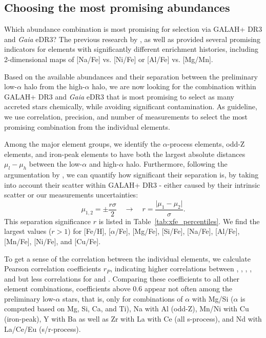 \documentclass[fleqn,usenatbib]{mnras}
\newcommand{\Gaia}{\textit{Gaia}\xspace} %
\begin{document}
\subsection{Choosing the most promising abundances} \label{sec:choosing_chemical_selection}

Which abundance combination is most promising for selection via GALAH+ DR3 and \Gaia eDR3? The previous research by \citet{Nissen2010, Nissen2011}, \citet{Hawkins2015} as well as \citet{Hayes2018} provided several promising indicators for elements with significantly different enrichment histories, including 2-dimensional maps of [Na/Fe] vs. [Ni/Fe] or [Al/Fe] vs. [Mg/Mn].

Based on the available abundances and their separation between the preliminary low-$\alpha$ halo from the high-$\alpha$ halo, we are now looking for the combination within GALAH+ DR3 and \Gaia eDR3 that is most promising to select as many accreted stars chemically, while avoiding significant contamination. As guideline, we use correlation, precision, and number of measurements to select the most promising combination from the individual elements.

Among the major element groups, we identify the $\alpha$-process elements, odd-Z elements, and iron-peak elements to have both the largest absolute distances $\mu_l - \mu_h$ between the low-$\alpha$ and high-$\alpha$ halo. Furthermore, following the argumentation by \citet{Lindegren2013}, we can quantify how significant their separation is, by taking into account their scatter within GALAH+ DR3 - either caused by their intrinsic scatter or our measurements uncertainties: 
\begin{equation}
\mu_{1,2} = \pm \frac{r \sigma}{2} \quad \rightarrow \quad r = \frac{\vert \mu_1 - \mu_2 \vert}{\sigma}.
\end{equation}
This separation significance $r$ is listed in Table~\ref{tab:xfe_percentiles}. We find the largest values ($r > 1$) for [Fe/H], [$\alpha$/Fe], [Mg/Fe], [Si/Fe], [Na/Fe], [Al/Fe], [Mn/Fe], [Ni/Fe], and [Cu/Fe]. 

To get a sense of the correlation between the individual elements, we calculate Pearson correlation coefficients $r_P$, indicating higher correlations between , , , , and  but less correlations for  and . Comparing these coefficients to all other element combinations, coefficients above 0.6 appear not often among the preliminary low-$\alpha$ stars, that is, only for combinations of $\alpha$ with Mg/Si ($\alpha$ is computed based on Mg, Si, Ca, and Ti), Na with Al (odd-Z), Mn/Ni with Cu (iron-peak), Y with Ba as well as Zr with La with Ce (all s-process), and Nd with La/Ce/Eu (s/r-process).
\end{document}

